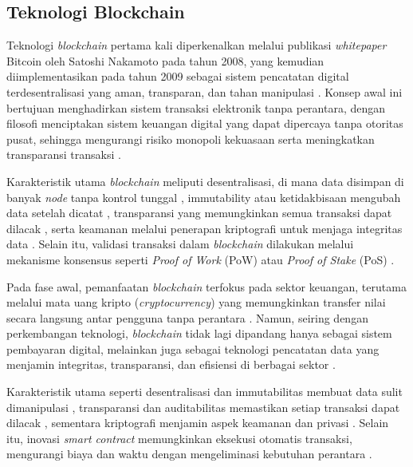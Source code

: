 \subsection{Teknologi Blockchain}

Teknologi \textit{blockchain} pertama kali diperkenalkan melalui publikasi \textit{whitepaper} Bitcoin oleh Satoshi Nakamoto pada tahun 2008, yang kemudian diimplementasikan pada tahun 2009 sebagai sistem pencatatan digital terdesentralisasi yang aman, transparan, dan tahan manipulasi \cite{dong2023, krichen2022, niranjanamurthy2018}. Konsep awal ini bertujuan menghadirkan sistem transaksi elektronik tanpa perantara, dengan filosofi menciptakan sistem keuangan digital yang dapat dipercaya tanpa otoritas pusat, sehingga mengurangi risiko monopoli kekuasaan serta meningkatkan transparansi transaksi \cite{dong2023, krichen2022, guo2022}. 

Karakteristik utama \textit{blockchain} meliputi desentralisasi, di mana data disimpan di banyak \textit{node} tanpa kontrol tunggal \cite{dong2023, ahram2017}, immutability atau ketidakbisaan mengubah data setelah dicatat \cite{krichen2022, guo2022}, transparansi yang memungkinkan semua transaksi dapat dilacak \cite{krichen2022, niranjanamurthy2018, guo2022}, serta keamanan melalui penerapan kriptografi untuk menjaga integritas data \cite{niranjanamurthy2018, ahram2017}. Selain itu, validasi transaksi dalam \textit{blockchain} dilakukan melalui mekanisme konsensus seperti \textit{Proof of Work} (PoW) atau \textit{Proof of Stake} (PoS) \cite{krichen2022, moosavi2021}.

Pada fase awal, pemanfaatan \textit{blockchain} terfokus pada sektor keuangan, terutama melalui mata uang kripto (\textit{cryptocurrency}) yang memungkinkan transfer nilai secara langsung antar pengguna tanpa perantara \cite{dong2023, jaoude2019}. Namun, seiring dengan perkembangan teknologi, \textit{blockchain} tidak lagi dipandang hanya sebagai sistem pembayaran digital, melainkan juga sebagai teknologi pencatatan data yang menjamin integritas, transparansi, dan efisiensi di berbagai sektor \cite{jaoude2019, habib2022, aljaroodi2019}. 

Karakteristik utama seperti desentralisasi dan immutabilitas membuat data sulit dimanipulasi \cite{dong2023, habib2022}, transparansi dan auditabilitas memastikan setiap transaksi dapat dilacak \cite{jaoude2019, aljaroodi2019}, sementara kriptografi menjamin aspek keamanan dan privasi \cite{habib2022, raddatz2021}. Selain itu, inovasi \textit{smart contract} memungkinkan eksekusi otomatis transaksi, mengurangi biaya dan waktu dengan mengeliminasi kebutuhan perantara \cite{jaoude2019, mahmudnia2022}.


